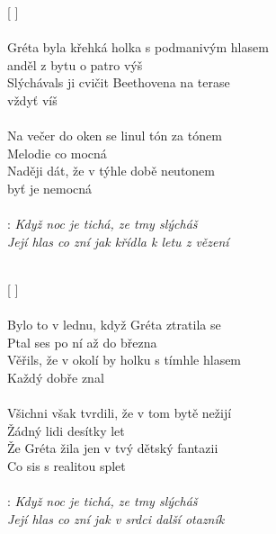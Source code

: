 
[    ]\\
\\

Gréta byla křehká holka s podmanivým hlasem\\
anděl z bytu o patro výš \\
Slýchávals ji cvičit Beethovena na terase\\
 vždyť víš \\
\\
Na večer do oken se linul tón za tónem\\
Melodie co mocná\\
Naději dát, že v týhle době neutonem\\
byť je nemocná\\
\\

\textregistered:
\emph{
  Když noc je tichá, ze tmy slýcháš\\
  Její hlas co zní jak křídla k letu z vězení\\
\\
}

[    ]\\
\\

Bylo to v lednu, když Gréta ztratila se\\
Ptal ses po ní až do března\\
Věřils, že v okolí by holku s tímhle hlasem\\
Každý dobře znal\\
\\
Všichni však tvrdili, že v tom bytě nežijí\\
Žádný lidi desítky let\\
Že Gréta žila jen v tvý dětský fantazii\\
Co sis s realitou splet\\
\\

\textregistered:
\emph{
  Když noc je tichá, ze tmy slýcháš\\
  Její hlas co zní jak v srdci další otazník\\
\\
}

